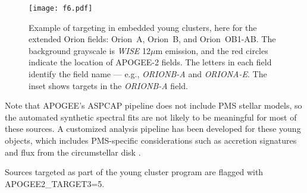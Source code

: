 \documentclass[12pt,twocolumn]{emulateapj}
\begin{document}
\begin{figure}[!h]
\begin{center}
\texttt{[image: f6.pdf]} %
\caption{
Example of targeting in embedded young clusters, here for the extended Orion fields: Orion~A, Orion~B, and Orion~OB1-AB.  The background grayscale is {\it WISE} 12$\mu$m emission, and the red circles indicate the location of APOGEE-2 fields.  The letters in each field identify the field name --- e.g., {\it ORIONB-A} and {\it ORIONA-E}. The inset shows targets in the {\it ORIONB-A} field.
}
\label{fig:insync}
\end{center}
\end{figure}

Note that APOGEE's ASPCAP pipeline does not include PMS stellar models, so the automated synthetic spectral fits are not likely to be meaningful for most of these sources.  A customized analysis pipeline has been developed for these young objects, which includes PMS-specific considerations such as accretion signatures and flux from the circumstellar disk \citep{Cottaar_2014_insync,DaRio_2016_insyncOrionA}.  

Sources targeted as part of the young cluster program are flagged with APOGEE2\_TARGET3=5.  
\end{document}
